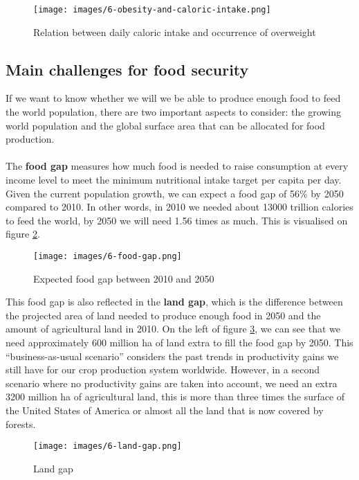 \documentclass[../summary.tex]{subfiles}
\begin{document}
	\begin{figure}[htbp]
		\centering
		\texttt{[image: images/6-obesity-and-caloric-intake.png]}
		\caption{Relation between daily caloric intake and occurrence of overweight}
		\label{fig:obesity-and-caloric-intake}
	\end{figure}
	
	\subsection{Main challenges for food security}
	
	If we want to know whether we will we be able to produce enough food to feed the world population, there are two important aspects to consider: the growing world population and the global surface area that can be allocated for food production.
	\\\\
	The \textbf{food gap} measures how much food is needed to raise consumption at every income level to meet the minimum nutritional intake target per capita per day. Given the current population growth, we can expect a food gap of 56\% by 2050 compared to 2010. In other words, in 2010 we needed about 13000 trillion calories to feed the world, by 2050 we will need 1.56 times as much. This is visualised on figure \ref{fig:food_gap}.
	
	\begin{figure}[htbp]
		\centering
		\texttt{[image: images/6-food-gap.png]}
		\caption{Expected food gap between 2010 and 2050}
		\label{fig:food_gap}
	\end{figure}
	
	This food gap is also reflected in the \textbf{land gap}, which is the difference between the projected area of land needed to produce enough food in 2050 and the amount of agricultural land in 2010. On the left of figure \ref{fig:land_gap}, we can see that we need approximately 600 million \unit{\hectare} of land extra to fill the food gap by 2050. This “business-as-usual scenario” considers the past trends in productivity gains we still have for our crop production system worldwide. However, in a second scenario where no productivity gains are taken into account, we need an extra 3200 million \unit{\hectare} of agricultural land, this is more than three times the surface of the United States of America or almost all the land that is now covered by forests.
	\\
	\begin{figure}[htbp]
		\centering
		\texttt{[image: images/6-land-gap.png]}
		\caption{Land gap}
		\label{fig:land_gap}
	\end{figure}
	
\end{document}
